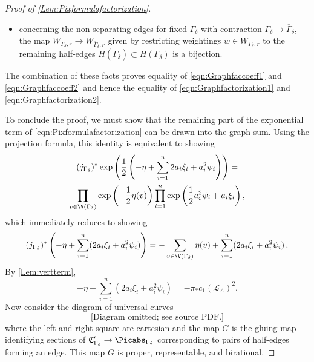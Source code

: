 \begin{proof}[Proof of \cref{Lem:Pixformulafactorization}]
\begin{itemize}
    \item concerning the non-separating edges for fixed $\Gamma_\delta$ with contraction $\Gamma_\delta \to \overline{\Gamma}_\delta$, the map $W_{\Gamma_\delta,r} \to W_{\overline{\Gamma}_\delta,r}$ given by restricting weightings $w \in W_{\Gamma_\delta,r}$ to the remaining half-edges $H(\overline{\Gamma}_\delta) \subset H({\Gamma}_\delta)$ is a bijection.
\end{itemize}
The combination of these facts proves equality of \eqref{eqn:Graphfaccoeff1} and \eqref{eqn:Graphfaccoeff2} and hence the equality of \eqref{eqn:Graphfactorization1} and \eqref{eqn:Graphfactorization2}.

To conclude the proof, we must show that the remaining part of the exponential term of \eqref{eqn:Pixformulafactorization} can be drawn into the graph sum. Using the projection formula, this identity is equivalent to showing
\begin{multline*}
(j_{\Gamma_\delta})^* \exp \left( \frac{1}{2} \left(-\eta + \sum_{i=1}^n 2 a_i \xi_i+ a_i^2 \psi_i \right) \right) = \\ \prod_{v \in \V(\Gamma_\delta)} \exp\left(-\frac12 \eta(v) \right) \prod_{i=1}^n \exp\left(\frac12 a_i^2 \psi_i + a_i \xi_i \right)
,
\end{multline*}
which immediately reduces to showing
\[(j_{\Gamma_\delta})^*  \left(-\eta + \sum_{i=1}^n (2 a_i \xi_i+ a_i^2 \psi_i) \right) = -\sum_{v \in \V(\Gamma_\delta)} \eta(v) + \sum_{i=1}^n (2 a_i \xi_i + a_i^2 \psi_i)
\, .\]
By \cref{Lem:vertterm},
    \[-\eta + \sum_{i=1}^n (2 a_i \xi_i+ a_i^2 \psi_i) = - \pi_* c_1(\mathcal{L}_A)^2.\]
Now consider the diagram of universal curves
\[
\text{[Diagram omitted; see source PDF.]}
\]
where the left and right square are cartesian and the map $G$ is the gluing map identifying sections of $\frak C'_{\Gamma_{\delta}} \to \Picabs_{\Gamma_\delta}$ corresponding to pairs of half-edges forming an edge. This map $G$ is proper, representable, and birational.


\end{proof}
